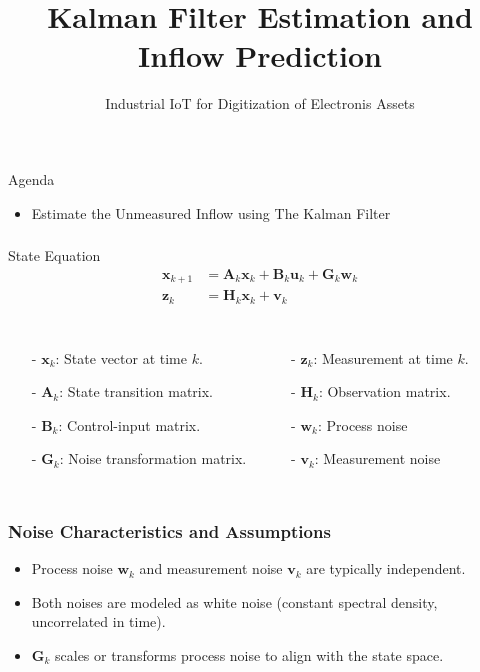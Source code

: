 \documentclass[aspectratio=169,hyperref={pdfpagelabels=false}]{beamer}
\subtitle{\normalsize{Industrial IoT for Digitization of Electronis Assets}}
\title{Kalman Filter Estimation and Inflow Prediction}
\begin{document}
\inserttitlepage

\begin{frame}{Agenda}
  \begin{itemize}
    \item Estimate the Unmeasured Inflow using The Kalman Filter 
  \end{itemize}
\end{frame}

\begin{frame}
  \frametitle{}
      \begin{block}{State Equation}
        \begin{align*}
          \mathbf{x}_{k+1} &= \mathbf{A}_k \mathbf{x}_k + \mathbf{B}_k \mathbf{u}_k + \mathbf{G}_k \mathbf{w}_k \\
          \mathbf{z}_k &= \mathbf{H}_k \mathbf{x}_k + \mathbf{v}_k 
      \end{align*}
        \end{block}
        \begin{columns}
          \begin{itemize}
              \item[-] \(\mathbf{x}_k\): State vector at time \(k\).
              \item[-] \(\mathbf{A}_k\): State transition matrix.
              \item[-] \(\mathbf{B}_k\): Control-input matrix.
              \item[-] \(\mathbf{G}_k\): Noise transformation matrix.
              
          \end{itemize}
          
          \begin{itemize}
            \item[-] \(\mathbf{z}_k\): Measurement at time \(k\).
            \item[-] \(\mathbf{H}_k\): Observation matrix.
            \item[-]  \(\mathbf{w}_k\): Process noise
            \item[-] \(\mathbf{v}_k\): Measurement noise
        \end{itemize}
          \end{columns}


        \end{frame}

  
  \begin{frame}
  \frametitle{Noise Characteristics and Assumptions}
      \begin{itemize}
          \item Process noise \(\mathbf{w}_k\) and measurement noise \(\mathbf{v}_k\) are typically independent.
          \item Both noises are modeled as white noise (constant spectral density, uncorrelated in time).
          \item \(\mathbf{G}_k\) scales or transforms process noise to align with the state space.
      \end{itemize}
  \end{frame}
\end{document}

